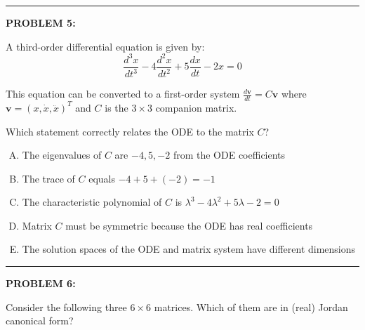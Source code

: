 \documentclass[12pt]{amsart}
\newcommand{\divider}{
  \vspace{-1em} %
  \noindent
  \raisebox{-0.15ex}{\textbullet}%
  \hspace{0.5em}%
  \rule[0.5ex]{0.95\textwidth}{1.0pt}%
  \hspace{0.5em}%
  \raisebox{-0.15ex}{\textbullet}%
  \vspace{0em} %
}
\begin{document}
\divider

{\bf PROBLEM 5:}

A third-order differential equation is given by:
$$\frac{d^3x}{dt^3} - 4\frac{d^2x}{dt^2} + 5\frac{dx}{dt} - 2x = 0$$

This equation can be converted to a first-order system $\frac{d\mathbf{v}}{dt} = C\mathbf{v}$ where $\mathbf{v} = (x, \dot{x}, \ddot{x})^T$ and $C$ is the $3 \times 3$ companion matrix.

Which statement correctly relates the ODE to the matrix $C$?

\begin{enumerate}[(A)]
\item The eigenvalues of $C$ are $-4, 5, -2$ from the ODE coefficients
\item The trace of $C$ equals $-4 + 5 + (-2) = -1$
\item The characteristic polynomial of $C$ is $\lambda^3 - 4\lambda^2 + 5\lambda - 2 = 0$
\item Matrix $C$ must be symmetric because the ODE has real coefficients
\item The solution spaces of the ODE and matrix system have different dimensions
\end{enumerate}


\divider
\newpage


{\bf PROBLEM 6:}

Consider the following three $6 \times 6$ matrices. Which of them are in (real) Jordan canonical form?
\end{document}
